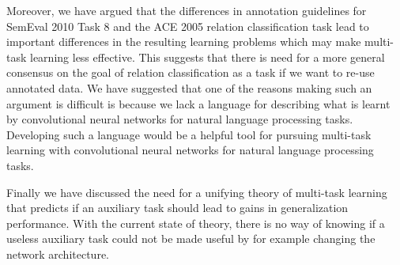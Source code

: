 Moreover, we have argued that the differences in annotation guidelines for SemEval 2010 Task 8 and the ACE 2005 relation classification task lead to important differences in the resulting learning problems which may make multi-task learning less effective. This suggests that there is need for a more general consensus on the goal of relation classification as a task if we want to re-use annotated data. We have suggested that one of the reasons making such an argument is difficult is because we lack a language for describing what is learnt by convolutional neural networks for natural language processing tasks. Developing such a language would be a helpful tool for pursuing multi-task learning with convolutional neural networks for natural language processing tasks.

Finally we have discussed the need for a unifying theory of multi-task learning that predicts if an auxiliary task should lead to gains in generalization performance. With the current state of theory, there is no way of knowing if a useless auxiliary task could not be made useful by for example changing the network architecture.

